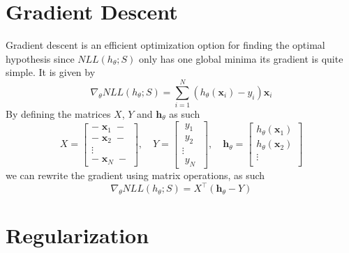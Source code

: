 \documentclass[12pt]{article}
\begin{document}
\section{Gradient Descent}

Gradient descent is an efficient optimization option for finding the optimal hypothesis since $NLL(h_\theta; S)$ only has one global minima its gradient is quite simple. It is given by
\[ \nabla_\theta NLL(h_\theta; S) = \sum_{i=1}^{N}(h_\theta(\mathbf{x}_i) - y_i)\mathbf{x}_i \]
By defining the matrices $X$, $Y$ and $\mathbf{h}_\theta$ as such
\[
	X =
	\begin{bmatrix}
		- \; \mathbf{x}_1 \; - \\
		- \; \mathbf{x}_2 \; - \\
		\vdots \\
		- \; \mathbf{x}_N \; -
	\end{bmatrix}
	, \quad
	Y =
	\begin{bmatrix}
		\; y_1 \; \\
		\; y_2 \; \\
		\vdots \\
		\; y_N \;
	\end{bmatrix}
	, \quad
	\mathbf{h}_\theta =
	\begin{bmatrix}
		h_\theta(\mathbf{x}_1) \\
		h_\theta(\mathbf{x}_2) \\
		\vdots \\
	\end{bmatrix}
\]
we can rewrite the gradient using matrix operations, as such
\[ \nabla_\theta NLL(h_\theta; S) = X^\top(\mathbf{h}_\theta - Y) \]

\section{Regularization}
\end{document}
